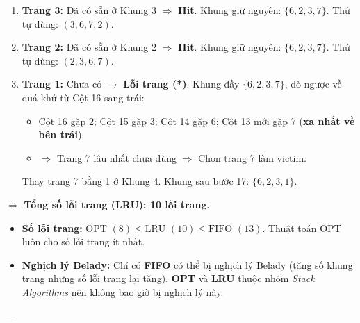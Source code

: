 \documentclass[11pt,a4paper]{article}
\begin{document}
\begin{enumerate}[label=\textbf{Cột \arabic*:}, leftmargin=*, itemsep=2pt]
\begin{itemize}[noitemsep]
    \end{itemize}
    Thay trang 1 bằng 6 ở Khung 1. Khung sau bước 14: $\{6, 2, 3, 7\}$. Thứ tự dùng: $(6, 7, 3, 2)$.
    \item \textbf{Trang 3:} Đã có sẵn ở Khung 3 $\Rightarrow$ \textbf{Hit}. Khung giữ nguyên: $\{6, 2, 3, 7\}$. Thứ tự dùng: $(3, 6, 7, 2)$.
    \item \textbf{Trang 2:} Đã có sẵn ở Khung 2 $\Rightarrow$ \textbf{Hit}. Khung giữ nguyên: $\{6, 2, 3, 7\}$. Thứ tự dùng: $(2, 3, 6, 7)$.
    \item \textbf{Trang 1:} Chưa có $\rightarrow$ \textbf{Lỗi trang (*)}. Khung đầy $\{6, 2, 3, 7\}$, dò ngược về quá khứ từ Cột 16 sang trái:
    \begin{itemize}[noitemsep]
        \item Cột 16 gặp 2; Cột 15 gặp 3; Cột 14 gặp 6; Cột 13 mới gặp 7 (\textbf{xa nhất về bên trái}).
        \item $\Rightarrow$ Trang 7 lâu nhất chưa dùng $\Rightarrow$ Chọn trang 7 làm victim.
    \end{itemize}
    Thay trang 7 bằng 1 ở Khung 4. Khung sau bước 17: $\{6, 2, 3, 1\}$.
\end{enumerate}
$\Rightarrow$ \textbf{Tổng số lỗi trang (LRU): 10 lỗi trang.}

\begin{importantbox}
\begin{itemize}[noitemsep]
    \item \textbf{Số lỗi trang:} $\text{OPT } (8) \le \text{LRU } (10) \le \text{FIFO } (13)$. Thuật toán OPT luôn cho số lỗi trang ít nhất.
    \item \textbf{Nghịch lý Belady:} Chỉ có \textbf{FIFO} có thể bị nghịch lý Belady (tăng số khung trang nhưng số lỗi trang lại tăng). \textbf{OPT} và \textbf{LRU} thuộc nhóm \textit{Stack Algorithms} nên không bao giờ bị nghịch lý này.
\end{itemize}
\end{importantbox}

---
\end{document}
